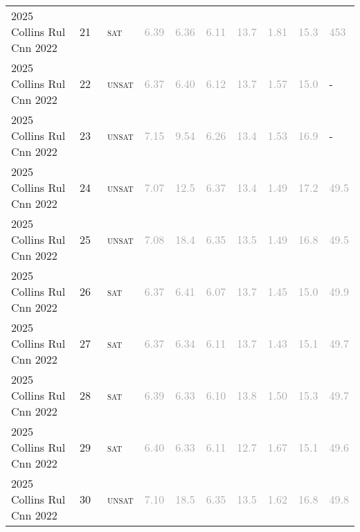 \begin{center}
{\begin{longtable}{@{}llllllllll@{}}
2025 Collins Rul Cnn 2022 & 21 & ~\textsc{sat} & \textcolor{darkgray}{6.39} & \textcolor{darkgray}{6.36} & \textcolor{darkgray}{6.11} & \textcolor{darkgray}{13.7} & \textcolor{darkgray}{1.81} & \textcolor{darkgray}{15.3} & \textcolor{darkgray}{453} \\
2025 Collins Rul Cnn 2022 & 22 & ~\textsc{unsat} & \textcolor{darkgray}{6.37} & \textcolor{darkgray}{6.40} & \textcolor{darkgray}{6.12} & \textcolor{darkgray}{13.7} & \textcolor{darkgray}{1.57} & \textcolor{darkgray}{15.0} & - \\
2025 Collins Rul Cnn 2022 & 23 & ~\textsc{unsat} & \textcolor{darkgray}{7.15} & \textcolor{darkgray}{9.54} & \textcolor{darkgray}{6.26} & \textcolor{darkgray}{13.4} & \textcolor{darkgray}{1.53} & \textcolor{darkgray}{16.9} & - \\
2025 Collins Rul Cnn 2022 & 24 & ~\textsc{unsat} & \textcolor{darkgray}{7.07} & \textcolor{darkgray}{12.5} & \textcolor{darkgray}{6.37} & \textcolor{darkgray}{13.4} & \textcolor{darkgray}{1.49} & \textcolor{darkgray}{17.2} & \textcolor{darkgray}{49.5} \\
2025 Collins Rul Cnn 2022 & 25 & ~\textsc{unsat} & \textcolor{darkgray}{7.08} & \textcolor{darkgray}{18.4} & \textcolor{darkgray}{6.35} & \textcolor{darkgray}{13.5} & \textcolor{darkgray}{1.49} & \textcolor{darkgray}{16.8} & \textcolor{darkgray}{49.5} \\
2025 Collins Rul Cnn 2022 & 26 & ~\textsc{sat} & \textcolor{darkgray}{6.37} & \textcolor{darkgray}{6.41} & \textcolor{darkgray}{6.07} & \textcolor{darkgray}{13.7} & \textcolor{darkgray}{1.45} & \textcolor{darkgray}{15.0} & \textcolor{darkgray}{49.9} \\
2025 Collins Rul Cnn 2022 & 27 & ~\textsc{sat} & \textcolor{darkgray}{6.37} & \textcolor{darkgray}{6.34} & \textcolor{darkgray}{6.11} & \textcolor{darkgray}{13.7} & \textcolor{darkgray}{1.43} & \textcolor{darkgray}{15.1} & \textcolor{darkgray}{49.7} \\
2025 Collins Rul Cnn 2022 & 28 & ~\textsc{sat} & \textcolor{darkgray}{6.39} & \textcolor{darkgray}{6.33} & \textcolor{darkgray}{6.10} & \textcolor{darkgray}{13.8} & \textcolor{darkgray}{1.50} & \textcolor{darkgray}{15.3} & \textcolor{darkgray}{49.7} \\
2025 Collins Rul Cnn 2022 & 29 & ~\textsc{sat} & \textcolor{darkgray}{6.40} & \textcolor{darkgray}{6.33} & \textcolor{darkgray}{6.11} & \textcolor{darkgray}{12.7} & \textcolor{darkgray}{1.67} & \textcolor{darkgray}{15.1} & \textcolor{darkgray}{49.6} \\
2025 Collins Rul Cnn 2022 & 30 & ~\textsc{unsat} & \textcolor{darkgray}{7.10} & \textcolor{darkgray}{18.5} & \textcolor{darkgray}{6.35} & \textcolor{darkgray}{13.5} & \textcolor{darkgray}{1.62} & \textcolor{darkgray}{16.8} & \textcolor{darkgray}{49.8} \\

\end{longtable}}
\end{center}
